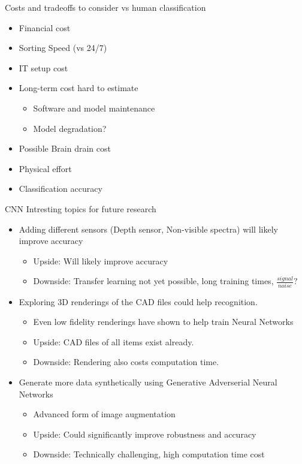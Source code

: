 \documentclass{beamer}
\begin{document}
\begin{frame}{Costs and tradeoffs to consider vs human classification}
  \begin{itemize}
      \item Financial cost 
      \item Sorting Speed (vs 24/7)
      \item IT setup cost
      \item Long-term cost hard to estimate
      \begin{itemize}
	\item Software and model maintenance
	\item Model degradation? 
      \end{itemize}
      \item Possible Brain drain cost 
      \item Physical effort
      \item Classification accuracy
  \end{itemize}
\end{frame}

\begin{frame}{CNN Intresting topics for future research}
\begin{itemize}
 \item Adding different sensors (Depth sensor, Non-visible spectra) will likely improve accuracy 
  \begin{itemize}
  \item Upside: Will likely improve accuracy 
  \item Downside: Transfer learning not yet possible, long training times, $\frac{signal}{noise}?$
  \end{itemize}
 \item Exploring 3D renderings of the CAD files could help recognition.
    \begin{itemize}
      \item Even low fidelity renderings have shown to help train Neural Networks
      \item Upside: CAD files of all items exist already.
      \item Downside: Rendering also costs computation time. 
    \end{itemize}
 \item Generate more data synthetically using Generative Adverserial Neural Networks
    \begin{itemize}
      \item Advanced form  of image augmentation 
      \item Upside: Could significantly improve robustness and accuracy 
      \item Downside: Technically challenging, high computation time cost 
    \end{itemize}

\end{itemize}
\end{frame}
\end{document}
